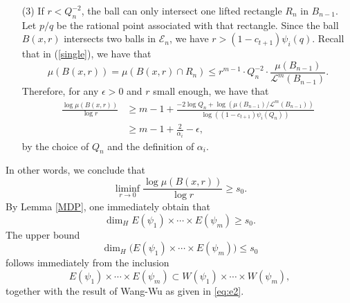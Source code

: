 \documentclass[11pt]{amsart}
\numberwithin{equation}{section}
\newcommand{\0}{\mathbf{0}}
\theoremstyle{remark}
\newcommand{\dimH}{\dim_{H}}
\begin{document}
{\begin{itemize}
\begin{align*}
    \mu(B(x,r))&\le\sum_{R_n\subset \mathcal{R}(B_{n-1}):R_n\cap B(x,r)\neq\emptyset}\mu(B(x,r)\cap R_n)\\
    &\lesssim r\cdot Q_n^2\cdot r^{m-1}\cdot Q_n^{-2}\cdot\frac{\mu(B_{n-1})}{\mathcal{L}^m(B_{n-1})}\\
    &\le r^{m}\cdot\frac{\mu(B_{n-1})}{\mathcal{L}^m(B_{n-1})}.
    \end{align*}
    It implies that for any $\epsilon>0$ and $r$ small enough,
    \begin{equation}\label{r2}
    \begin{split}
    \frac{\log\mu(B(x,r))}{\log r}&\ge m+\frac{\log (\mu(B_{n-1})/\mathcal{L}^m(B_{n-1}))}{\log r}\\
    &\ge m+\frac{\log( \mu(B_{n-1})/\mathcal{L}^m(B_{n-1}))}{\log Q_n^{-2}}\\
    &\ge m-\epsilon,
    \end{split}
    \end{equation}
    where the last inequality holds by the choice of $Q_n$.
    \item[(3)] If $r<Q_n^{-2}$, the ball can only intersect one lifted rectangle $R_n$ in $B_{n-1}$. Let $p/q$ be the rational point associated with that rectangle. Since the ball $B(x,r)$ 
     intersects two balls in $\mathcal{E}_n$, we have $r>(1-c_{t+1})\psi_i(q)$. 
    Recall that in (\ref{single}), we have that
        $$\mu(B(x,r))=\mu(B(x,r)\cap R_n)\le r^{m-1}\cdot Q_n^{-2}\cdot\frac{\mu(B_{n-1})}{\mathcal{L}^m(B_{n-1})}.$$
        Therefore, for any $\epsilon>0$ and $r$ small enough, we have that
        \begin{equation}\label{r3}
        \begin{split}
        \frac{\log\mu(B(x,r))}{\log r}&\ge m-1+\frac{-2\log Q_n+\log( \mu(B_{n-1})/\mathcal{L}^m(B_{n-1}))}{\log ((1-c_{t+1})\psi_i(Q_n))}\\
        &\ge m-1+\frac{2}{\alpha_i}-\epsilon,
        \end{split}
        \end{equation}
        by the choice of $Q_n$ and the definition of $\alpha_i$.
\end{itemize}

In other words, we conclude that
$$\liminf_{r\rightarrow 0}\frac{\log \mu(B(x,r))}{\log r}\ge s_0.$$
By Lemma \ref{MDP}, one immediately obtain that
$$\dimH E(\psi_1)\times\cdots\times E(\psi_m)\ge s_0.$$
The upper bound
\[
\dimH\bigl(E(\psi_1)\times\cdots\times E(\psi_m)\bigr)\leq s_0
\]
follows immediately from the inclusion
\[
E(\psi_1)\times\cdots\times E(\psi_m)
\subset
W(\psi_1)\times\cdots\times W(\psi_m),
\]
together with the result of Wang-Wu as given in \eqref{eq:e2}.

}
\end{document}
